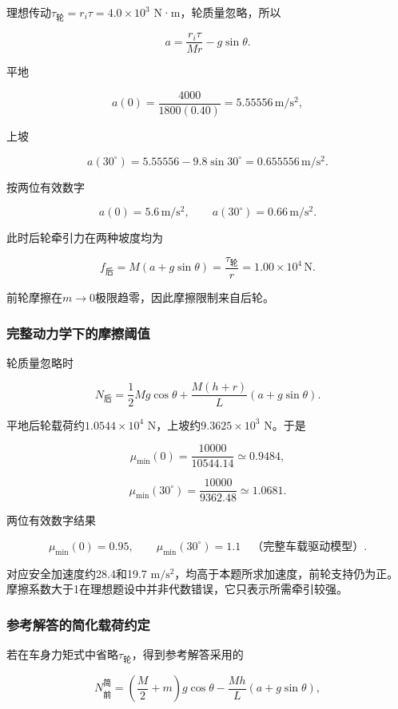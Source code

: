 \documentclass[12pt,a4paper,fontset=fandol]{ctexart}
\begin{document}
理想传动\(\tau_{\text{轮}}=r_i\tau=4.0\times10^3\) N·m，轮质量忽略，所以

\[
a=\frac{r_i\tau}{Mr}-g\sin\theta.
\]

平地

\[
a(0)=\frac{4000}{1800(0.40)}
=5.55556\,\mathrm{m/s^2},
\]

上坡

\[
a(30^\circ)=5.55556-9.8\sin30^\circ
=0.655556\,\mathrm{m/s^2}.
\]

按两位有效数字

\[
\boxed{a(0)=5.6\,\mathrm{m/s^2},\qquad
a(30^\circ)=0.66\,\mathrm{m/s^2}}.
\]

此时后轮牵引力在两种坡度均为

\[
f_{\text{后}}=M(a+g\sin\theta)
=\frac{\tau_{\text{轮}}}r=1.00\times10^4\,\mathrm N.
\]

前轮摩擦在\(m\to0\)极限趋零，因此摩擦限制来自后轮。

\subsubsection{完整动力学下的摩擦阈值}\label{ux5b8cux6574ux52a8ux529bux5b66ux4e0bux7684ux6469ux64e6ux9608ux503c}

轮质量忽略时

\[
N_{\text{后}}=\frac12Mg\cos\theta
+\frac{M(h+r)}L(a+g\sin\theta).
\]

平地后轮载荷约\(1.0544\times10^4\) N，上坡约\(9.3625\times10^3\) N。于是

\[
\mu_{\min}(0)=\frac{10000}{10544.14}\simeq0.9484,
\]

\[
\mu_{\min}(30^\circ)=\frac{10000}{9362.48}\simeq1.0681.
\]

两位有效数字结果

\[
\boxed{
\mu_{\min}(0)=0.95,\qquad
\mu_{\min}(30^\circ)=1.1}
\quad\text{（完整车载驱动模型）}.
\]

对应安全加速度约28.4和19.7
\(\mathrm{m/s^2}\)，均高于本题所求加速度，前轮支持仍为正。摩擦系数大于1在理想题设中并非代数错误，它只表示所需牵引较强。

\subsubsection{参考解答的简化载荷约定}\label{ux53c2ux8003ux89e3ux7b54ux7684ux7b80ux5316ux8f7dux8377ux7ea6ux5b9a}

若在车身力矩式中省略\(\tau_{\text{轮}}\)，得到参考解答采用的

\[
\boxed{
N_{\text{前}}^{\text{简}}
=\left(\frac M2+m\right)g\cos\theta
-\frac{Mh}L(a+g\sin\theta)},
\]
\end{document}
